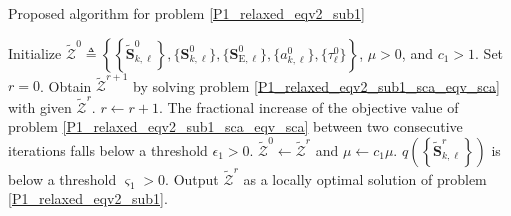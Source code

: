 \documentclass[12pt,draftclsnofoot, onecolumn]{IEEEtran}
\theoremstyle{plain}
\begin{document}
\begin{sloppypar}
\begin{algorithm}[!t]  
	\caption{Proposed algorithm for problem \eqref{P1_relaxed_eqv2_sub1}}  \label{Alg1}  
	\begin{algorithmic}[1]
		\STATE Initialize $\tilde{\mathcal Z}^0 \triangleq \left\lbrace \left\lbrace \tilde{\mathbf S}_{k,\ell}^0\right\rbrace, \{\mathbf S_{k,\ell}^0\}, \{\mathbf S_{\mathrm E,\ell}^0\}, \{ a_{k,\ell}^0\}, \{\tau_\ell^0\}\right\rbrace$, $\mu > 0$, and $c_1 > 1$.  %
		\REPEAT
		\STATE Set $r = 0$. 
		\REPEAT 
		\STATE Obtain $\tilde{\mathcal Z}^{r+1}$ by solving problem \eqref{P1_relaxed_eqv2_sub1_sca_eqv_sca} with given $\tilde{\mathcal Z}^{r}$. 
		\STATE $r \leftarrow r + 1$.
		\UNTIL The fractional increase of the objective value of problem \eqref{P1_relaxed_eqv2_sub1_sca_eqv_sca} between two consecutive iterations falls below a threshold $\epsilon_1 > 0$. 
		\STATE $\tilde{\mathcal Z}^0 \leftarrow \tilde{\mathcal Z}^r$ and $\mu\leftarrow c_1\mu$.
		\UNTIL $q\left(\left\lbrace\tilde{\mathbf S}_{k,\ell}^r\right\rbrace\right)$ is below a threshold $\varsigma_1 > 0$. 
		\STATE Output $\tilde{\mathcal Z}^r$ as a locally optimal solution of problem \eqref{P1_relaxed_eqv2_sub1}. 
	\end{algorithmic} 
\end{algorithm}


\end{sloppypar}
\end{document}
